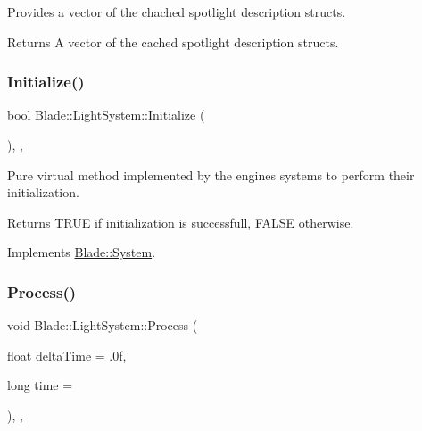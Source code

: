 Provides a vector of the chached spotlight description structs. 

\begin{DoxyReturn}{Returns}
A vector of the cached spotlight description structs. 
\end{DoxyReturn}
\mbox{\label{class_blade_1_1_light_system_af87b68ecd946b49576a17e59bfc88934}} 
\subsubsection{\texorpdfstring{Initialize()}{Initialize()}}
{\footnotesize\ttfamily bool Blade\+::\+Light\+System\+::\+Initialize (\begin{DoxyParamCaption}{ }\end{DoxyParamCaption})\hspace{0.3cm}{\ttfamily [override]}, {\ttfamily [virtual]}, {\ttfamily [noexcept]}}



Pure virtual method implemented by the engine\textquotesingle{}s systems to perform their initialization. 

\begin{DoxyReturn}{Returns}
T\+R\+UE if initialization is successfull, F\+A\+L\+SE otherwise. 
\end{DoxyReturn}


Implements \hyperlink{class_blade_1_1_system_a63fa00af40dc54d093300eff4785f26f}{Blade\+::\+System}.

\mbox{\label{class_blade_1_1_light_system_afbad47302dca40e57322a68252cb08e7}} 
\subsubsection{\texorpdfstring{Process()}{Process()}}
{\footnotesize\ttfamily void Blade\+::\+Light\+System\+::\+Process (\begin{DoxyParamCaption}\item[{float}]{delta\+Time = {\ttfamily .0f},  }\item[{long}]{time = {} }\end{DoxyParamCaption})\hspace{0.3cm}{\ttfamily [override]}, {\ttfamily [virtual]}, {\ttfamily [noexcept]}}



